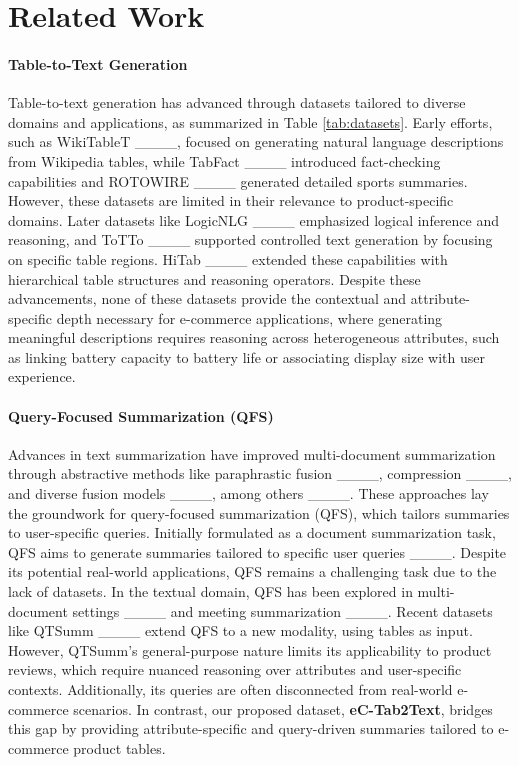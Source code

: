 \section{Related Work}
\paragraph{Table-to-Text Generation} 
Table-to-text generation has advanced through datasets tailored to diverse domains and applications, as summarized in Table \ref{tab:datasets}. Early efforts, such as WikiTableT ____, focused on generating natural language descriptions from Wikipedia tables, while TabFact ____ introduced fact-checking capabilities and ROTOWIRE ____ generated detailed sports summaries. However, these datasets are limited in their relevance to product-specific domains. Later datasets like LogicNLG ____ emphasized logical inference and reasoning, and ToTTo ____ supported controlled text generation by focusing on specific table regions. HiTab ____ extended these capabilities with hierarchical table structures and reasoning operators. Despite these advancements, none of these datasets provide the contextual and attribute-specific depth necessary for e-commerce applications, where generating meaningful descriptions requires reasoning across heterogeneous attributes, such as linking battery capacity to battery life or associating display size with user experience. 


\paragraph{Query-Focused Summarization (QFS)} 
Advances in text summarization have improved multi-document summarization through abstractive methods like paraphrastic fusion ____, compression ____, and diverse fusion models ____, among others ____. These approaches lay the groundwork for query-focused summarization (QFS), which tailors summaries to user-specific queries. Initially formulated as a document summarization task, QFS aims to generate summaries tailored to specific user queries ____. Despite its potential real-world applications, QFS remains a challenging task due to the lack of datasets. In the textual domain, QFS has been explored in multi-document settings ____ and meeting summarization ____. Recent datasets like QTSumm ____ extend QFS to a new modality, using tables as input. However, QTSumm's general-purpose nature limits its applicability to product reviews, which require nuanced reasoning over attributes and user-specific contexts. Additionally, its queries are often disconnected from real-world e-commerce scenarios. In contrast, our proposed dataset, \textbf{eC-Tab2Text}, bridges this gap by providing attribute-specific and query-driven summaries tailored to e-commerce product tables.